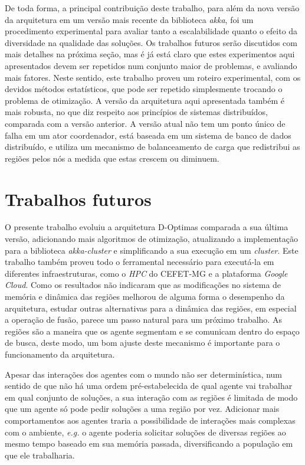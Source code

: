 De toda forma, a principal contribuição deste trabalho, para além da nova versão da arquitetura em um versão mais recente da biblioteca \textit{akka}, foi um procedimento experimental para avaliar tanto a escalabilidade quanto o efeito da diversidade na qualidade das soluções. Os trabalhos futuros serão discutidos com mais detalhes na próxima seção, mas é já está claro que estes experimentos aqui apresentados devem ser repetidos num conjunto maior de problemas, e avaliando mais fatores. Neste sentido, este trabalho proveu um roteiro experimental, com os devidos métodos estatísticos, que pode ser repetido simplesmente trocando o problema de otimização. A versão da arquitetura aqui apresentada também é mais robusta, no que diz respeito aos princípios de sistemas distribuídos, comparada com a versão anterior. A versão atual não tem um ponto único de falha em um ator coordenador, está baseada em um sistema de banco de dados distribuído, e utiliza um mecanismo de balanceamento de carga que redistribui as regiões pelos nós a medida que estas crescem ou diminuem. 

\section{Trabalhos futuros}

O presente trabalho evoluiu a arquitetura D-Optimas comparada a sua última versão, adicionando mais algoritmos de otimização, atualizando a implementação para a biblioteca \textit{akka-cluster} e simplificando a sua execução em um \textit{cluster}. Este trabalho também proveu todo o ferramental necessário para executá-la em diferentes infraestruturas, como o \textit{HPC} do CEFET-MG e a plataforma \textit{Google Cloud}. Como os resultados não indicaram que as modificações no sistema de memória e dinâmica das regiões melhorou de alguma forma o desempenho da arquitetura, estudar outras alternativas para a dinâmica das regiões, em especial a operação de fusão, parece um passo natural para um próximo trabalho. As regiões são a maneira que os agente segmentam e se comunicam dentro do espaço de busca, deste modo, um bom ajuste deste mecanismo é importante para o funcionamento da arquitetura.

Apesar das interações dos agentes com o mundo não ser determinística, num sentido de que não há uma ordem pré-estabelecida de qual agente vai trabalhar em qual conjunto de soluções, a sua interação com as regiões é limitada de modo que um agente só pode pedir soluções a uma região por vez. Adicionar mais comportamentos aos agentes traria a possibilidade de interações mais complexas com o ambiente, \textit{e.g.} o agente poderia solicitar soluções de diversas regiões ao mesmo tempo baseado em sua memória passada, diversificando a população em que ele trabalharia.

